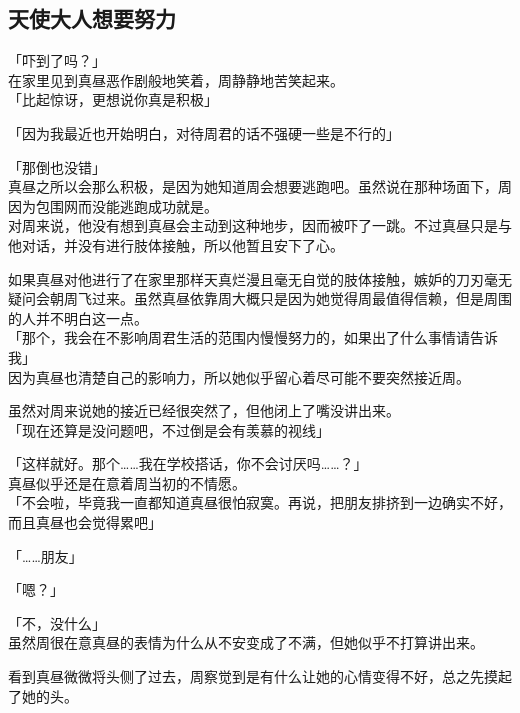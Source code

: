 \subsection{天使大人想要努力}

「吓到了吗？」\\

在家里见到真昼恶作剧般地笑着，周静静地苦笑起来。\\

「比起惊讶，更想说你真是积极」

「因为我最近也开始明白，对待周君的话不强硬一些是不行的」

「那倒也没错」\\

真昼之所以会那么积极，是因为她知道周会想要逃跑吧。虽然说在那种场面下，周因为包围网而没能逃跑成功就是。\\

对周来说，他没有想到真昼会主动到这种地步，因而被吓了一跳。不过真昼只是与他对话，并没有进行肢体接触，所以他暂且安下了心。

如果真昼对他进行了在家里那样天真烂漫且毫无自觉的肢体接触，嫉妒的刀刃毫无疑问会朝周飞过来。虽然真昼依靠周大概只是因为她觉得周最值得信赖，但是周围的人并不明白这一点。\\

「那个，我会在不影响周君生活的范围内慢慢努力的，如果出了什么事情请告诉我」\\

因为真昼也清楚自己的影响力，所以她似乎留心着尽可能不要突然接近周。

虽然对周来说她的接近已经很突然了，但他闭上了嘴没讲出来。\\

「现在还算是没问题吧，不过倒是会有羡慕的视线」

「这样就好。那个……我在学校搭话，你不会讨厌吗……？」\\

真昼似乎还是在意着周当初的不情愿。\\

「不会啦，毕竟我一直都知道真昼很怕寂寞。再说，把朋友排挤到一边确实不好，而且真昼也会觉得累吧」

「……朋友」

「嗯？」

「不，没什么」\\

虽然周很在意真昼的表情为什么从不安变成了不满，但她似乎不打算讲出来。

看到真昼微微将头侧了过去，周察觉到是有什么让她的心情变得不好，总之先摸起了她的头。\\

